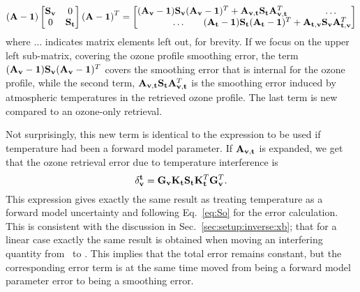 \begin{displaymath}
  \left(\AvrKrnMtr-\IdnMtr\right)
  \begin{bmatrix}
    \aCvrMtr{\VctStl{v}} & 0 \\
    0 & \aCvrMtr{\VctStl{t}} 
  \end{bmatrix} 
  \left(\AvrKrnMtr-\IdnMtr\right)^T =
  \begin{bmatrix}
    (\AvrKrnMtr_{\VctStl{v}}-\IdnMtr)\aCvrMtr{\VctStl{v}}
    (\AvrKrnMtr_{\VctStl{v}}-\IdnMtr)^T + 
    \AvrKrnMtr_{\VctStl{v},\VctStl{t}}\aCvrMtr{\VctStl{t}}\AvrKrnMtr_{\VctStl{v},\VctStl{t}}^T
    & \hspace{5mm}\dots \\
    \hspace{-25mm}\dots & \hspace{-35mm}%
    (\AvrKrnMtr_{\VctStl{t}}-\IdnMtr)\aCvrMtr{\VctStl{t}}
    (\AvrKrnMtr_{\VctStl{t}}-\IdnMtr)^T + 
    \AvrKrnMtr_{\VctStl{t},\VctStl{v}}\aCvrMtr{\VctStl{v}}\AvrKrnMtr_{\VctStl{t},\VctStl{v}}^T
  \end{bmatrix} 
\end{displaymath}
where $\dots$ indicates matrix elements left out, for brevity. If we
focus on the upper left sub-matrix, covering the ozone profile smoothing error,
the term $(\mathbf{A}_{\mathbf{v}}-\mathbf{1})\mathbf{S}_{\mathbf{v}}
(\mathbf{A}_{\mathbf{v}}-\mathbf{1})^T$ covers the smoothing error that is
internal for the ozone profile, while the second term,
$\mathbf{A}_{\mathbf{v},\mathbf{t}}\mathbf{S}_{\mathbf{t}}\mathbf{A}_{\mathbf{v},\mathbf{t}}^T$
is the smoothing error induced by atmospheric temperatures in the retrieved
ozone profile. The last term is new compared to an ozone-only retrieval.

Not surprisingly, this new term is identical to the expression to be used if
temperature had been a forward model parameter. If
$\mathbf{A}_{\mathbf{v},\mathbf{t}}$ is expanded, we get that the ozone retrieval
error due to temperature interference is \citep{rodgers2003intercomparison}
\begin{displaymath}
  \delta_{\mathbf{v}}^{\mathbf{t}} =
  \mathbf{G}_{\mathbf{v}}\mathbf{K}_{\mathbf{t}}\mathbf{S}_{\mathbf{t}}
   \mathbf{K}_{\mathbf{t}}^T\mathbf{G}_{\mathbf{v}}^T.
\end{displaymath}
This expression gives exactly the same result as treating temperature as a
forward model uncertainty and following Eq.~\ref{eq:So} for the error
calculation. This is consistent with the discussion in
Sec.~\ref{sec:setup:inverse:xb}; that for a linear case exactly the same result
is obtained when moving an interfering quantity from \FrwMdlVct\ to \SttVct.
This implies that the total error remains constant, but the corresponding error
term is at the same time moved from being a forward model parameter error to
being a smoothing error. 

